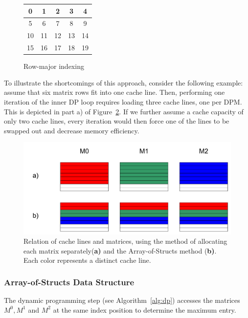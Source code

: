 \documentclass[runningheads,a4paper]{llncs}
\begin{document}
\begin{figure}
\begin{minipage}{0.7\textwidth}
\centering
\begin{tabular}{|c|c|c|c|c|}
\hline
0 & 1 & 2 & 3 & 4 \\
\hline
5 & 6 & 7 & 8 & 9 \\
\hline
10 & 11 & 12 & 13 & 14 \\
\hline
15 & 16 & 17 & 18 & 19 \\
\hline
\end{tabular}
\caption{Row-major indexing}
\label{fig:rowmajor}
\end{minipage}
\end{figure}

To illustrate the shortcomings of this approach, consider the following example: assume that six matrix rows fit into one cache line.
Then, performing one iteration of the inner DP loop requires loading three cache lines, one per DPM.
This is depicted in part a) of Figure~\ref{fig:cachelines}.
If we further assume a cache capacity of only two cache lines,
every iteration would then force one of the lines to be swapped out and decrease memory efficiency.

\begin{figure}
\centering
\includegraphics[width=\textwidth]{images/cachelines.pdf}
\caption{Relation of cache lines and matrices, using the method of allocating each matrix separately(\textbf{a)} and the Array-of-Structs method (\textbf{b)}.
Each color represents a distinct cache line.}
\label{fig:cachelines}
\end{figure}

\subsubsection{Array-of-Structs Data Structure}
The dynamic programming step (see Algorithm~\ref{alg:dp}) accesses the matrices $M^0, M^1$ and $M^2$ at the same index position to determine the maximum entry.
\end{document}
